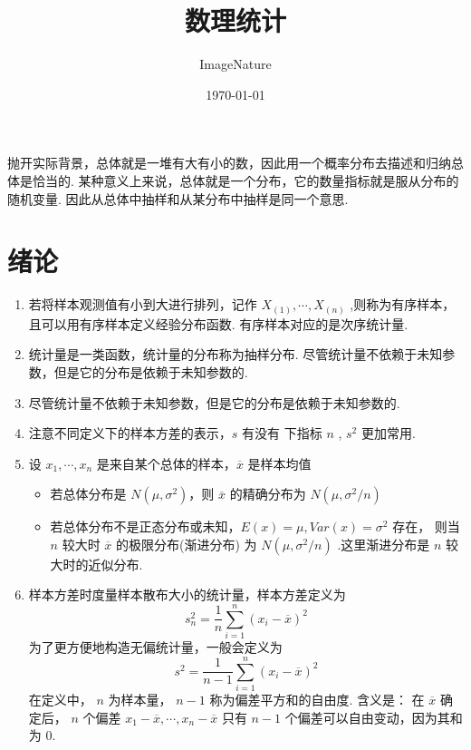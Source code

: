 \documentclass[a5paper,12pt]{article}
\title{数理统计}
\author{ImageNature}
\date{\today}
\begin{document}
\maketitle


抛开实际背景，总体就是一堆有大有小的数，因此用一个概率分布去描述和归纳总体是恰当的.
某种意义上来说，总体就是一个分布，它的数量指标就是服从分布的随机变量.
因此从总体中抽样和从某分布中抽样是同一个意思.
\section{绪论}

\begin{enumerate}
  \item 若将样本观测值有小到大进行排列，记作 $X_{(1)},\cdots,X_{(n)}$ ,则称为有序样本，且可以用有序样本定义经验分布函数. 有序样本对应的是次序统计量.
  \item 统计量是一类函数，统计量的分布称为抽样分布. 尽管统计量不依赖于未知参数，但是它的分布是依赖于未知参数的.
    \item 尽管统计量不依赖于未知参数，但是它的分布是依赖于未知参数的.
  \item 注意不同定义下的样本方差的表示，$s$ 有没有 下指标 $n$ ,  $s^2$ 更加常用.
  \item 设 $x_1,\cdots,x_n$ 是来自某个总体的样本，$\overline{x}$ 是样本均值
  \begin{itemize}
    \item 若总体分布是 $N(\mu,\sigma^2)$，则 $\overline{x}$ 的精确分布为 $N(\mu,\sigma^2/n)$
    \item 若总体分布不是正态分布或未知，$E(x) = \mu,Var(x) = \sigma^2$ 存在，
    则当 $n$ 较大时 $\overline{x}$ 的极限分布(渐进分布) 为 $N(\mu,\sigma^2/n)$ .这里渐进分布是 $n$ 较大时的近似分布.
  \end{itemize}
 \item 样本方差时度量样本散布大小的统计量，样本方差定义为
 \[
 s_n^2 = \frac1 n \sum_{i=1}^{n} (x_i - \overline{x})^2
 \]
 为了更方便地构造无偏统计量，一般会定义为
 \[
 s^2 = \frac{1}{n-1}\sum_{i=1}^{n}(x_i - \overline{x})^2
 \]
 在定义中， $n$ 为样本量， $n-1$ 称为偏差平方和的自由度. 含义是：
 在 $\overline{x}$ 确定后， $n$ 个偏差 $x_1 - \overline{x},\cdots,x_n - \overline{x}$ 只有
 $n-1$ 个偏差可以自由变动，因为其和为 $0$.





\end{enumerate}
\end{document}
